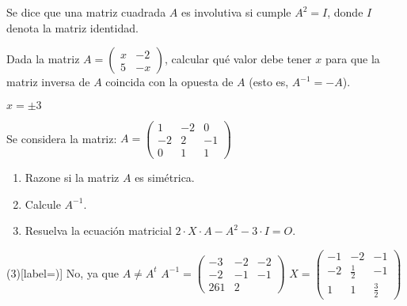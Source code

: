 \begin{ejer}
Se dice que una matriz cuadrada $A$ es involutiva si cumple $A^2=I$, donde $I$ denota la matriz identidad.
\bex
{}
\eex
\end{ejer}
\begin{ejer}
Dada la matriz $A=\begin{pmatrix}
x & -2 \\
5 & -x
\end{pmatrix} $, calcular qué valor debe tener $x$ para que la matriz inversa de $A$ coincida con la opuesta de $A$ (esto es, $A^{-1}=-A$).
\begin{solu}
$x=\pm 3 $
\end{solu}
\end{ejer}

\begin{ejer}
Se considera la matriz: $A = \begin{pmatrix}
1 & -2 & 0 \\
-2 & 2 & -1 \\
0 & 1 & 1
\end{pmatrix}$
\begin{enumerate}[label=\alph*)]
\item Razone si la matriz $A$ es simétrica.
\item Calcule $A^{-1}$.
\item Resuelva la ecuación matricial $2 \cdot X \cdot A - A^2 -3 \cdot I = O $.
\end{enumerate}

\begin{solu}
\begin{tasks}(3)[label=\alph*)]
\task No, ya que $A \neq A^t$
\task $A^{-1}=\begin{pmatrix}
-3 & -2 & -2 \\
-2 & -1 & -1 \\
2 6 1 & 2
\end{pmatrix}$
\task $X=\begin{pmatrix}
-1 & -2 & -1 \\
-2 & \frac{1}{2} & -1 \\
1 & 1 & \frac{3}{2}
\end{pmatrix}$
\end{tasks}
\end{solu}
\end{ejer}


\newpage

\soluciones
\solucionesCap{\thechapter}